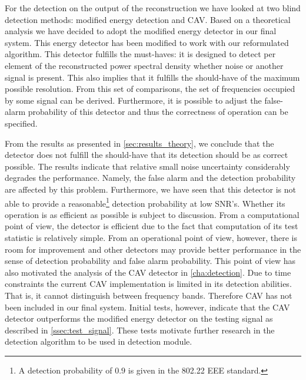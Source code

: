 \documentclass[a4paper, openany, oneside]{memoir}
\begin{document}
For the detection on the output of the reconstruction we have looked at two blind detection methods: modified energy detection and CAV. Based on  a theoretical analysis we have decided to adopt the modified energy detector in our final system. This energy detector has been modified to work with our reformulated algorithm. This detector fulfills the must-haves: it is designed to detect per element of the reconstructed power spectral
density whether noise or another signal is present. This also implies that it fulfills the should-have of the maximum possible resolution.  From this set of comparisons, the set of frequencies occupied by some signal can be derived. Furthermore, it is possible to adjust the false-alarm probability of this detector and thus the correctness of operation can be specified. 

From the results as presented in \cref{sec:results_theory}, we conclude that the detector does not fulfill the should-have that its detection should be as correct possible. The results indicate that relative small noise uncertainty considerably degrades the  performance. Namely, the false alarm and the detection probability are affected by this problem. Furthermore, we have seen that this detector is not able to provide a reasonable\footnote{A detection probability of $0.9$ is given in the 802.22 EEE standard.} detection probability at low SNR's. Whether its operation is as efficient as possible is subject  to discussion. From a computational point of view, the detector is efficient due to the fact that computation of its test statistic is relatively simple. From an operational point of view, however, there is room for improvement and other detectors may provide better performance in the sense of detection probability and false alarm probability. This point of view has also motivated the analysis of the CAV detector in \cref{cha:detection}. Due to time constraints the current CAV implementation is limited in its detection abilities. That is, it cannot distinguish between frequency bands. Therefore CAV has not been included in our final system. Initial tests, however, indicate that the CAV detector outperforms the modified energy detector on the testing signal as described in \cref{ssec:test_signal}. These tests motivate further research in the detection algorithm to be used in detection module. 
\end{document}
